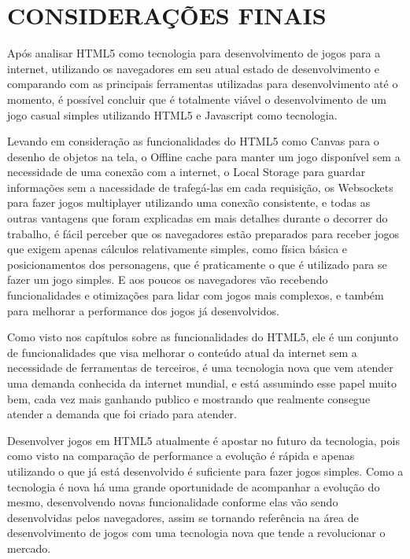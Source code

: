 \section[Considerações finais]{CONSIDERAÇÕES FINAIS}

Após analisar HTML5 como tecnologia para desenvolvimento de jogos para
a internet, utilizando os navegadores em seu atual estado de
desenvolvimento e comparando com as principais ferramentas utilizadas
para desenvolvimento até o momento, é possível concluir que é
totalmente viável o desenvolvimento de um jogo casual simples
utilizando HTML5 e Javascript como tecnologia.

Levando em consideração as funcionalidades do HTML5 como Canvas para o
desenho de objetos na tela, o Offline cache para manter um jogo
disponível sem a necessidade de uma conexão com a internet, o Local
Storage para guardar informações sem a nacessidade de trafegá-las em
cada requisição, os Websockets para fazer jogos multiplayer utilizando
uma conexão consistente, e todas as outras vantagens que foram
explicadas em mais detalhes durante o decorrer do trabalho,
é fácil perceber que os navegadores estão preparados para
receber jogos que exigem apenas cálculos relativamente
simples, como física básica e posicionamentos dos personagens, que é
praticamente o que é utilizado para se fazer um jogo simples. E aos
poucos os navegadores vão recebendo funcionalidades e otimizações para
lidar com jogos mais complexos, e também para melhorar a performance
dos jogos já desenvolvidos.

Como visto nos capítulos sobre as funcionalidades do HTML5, ele é um
conjunto de funcionalidades que visa melhorar o conteúdo
atual da internet sem a necessidade de ferramentas de terceiros, é uma
tecnologia nova que vem atender uma demanda conhecida da
internet mundial, e está assumindo esse papel muito bem, cada vez mais
ganhando publico e mostrando que realmente consegue atender a demanda
que foi criado para atender.

Desenvolver jogos em HTML5 atualmente é
apostar no futuro da tecnologia, pois como visto na comparação de
performance a evolução é rápida e apenas utilizando o que já está
desenvolvido é suficiente para fazer jogos simples. Como a tecnologia
é nova há uma grande oportunidade de acompanhar a evolução do mesmo,
desenvolvendo novas funcionalidade conforme elas vão sendo desenvolvidas
pelos navegadores, assim se tornando referência na área de
desenvolvimento de jogos com uma tecnologia nova que tende a revolucionar o mercado.

